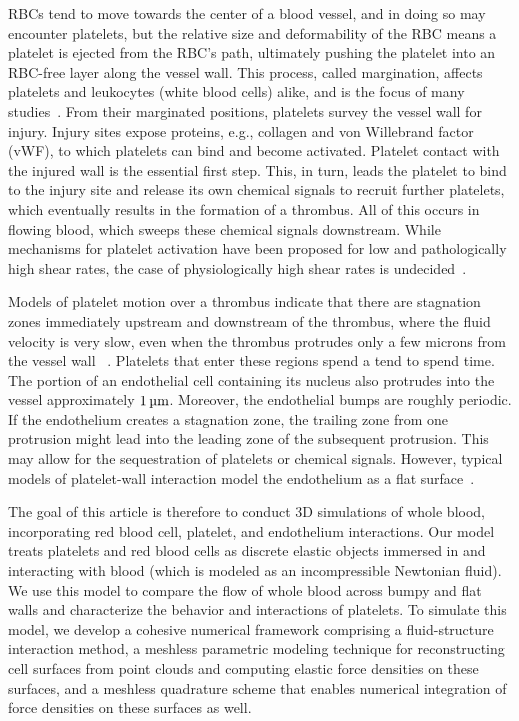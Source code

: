 RBCs tend to move towards the center of a blood vessel, and in doing so may encounter
platelets, but the relative size and deformability of the RBC means a platelet is ejected
from the RBC's path, ultimately pushing the platelet into an RBC-free layer along the
vessel wall. This process, called margination, affects platelets and leukocytes (white
blood cells) alike, and is the focus of many studies~\cite{Freund:2007kx,Erickson:2010ep,
Erickson:2011cf,Zhao:2011do,Kumar:2011dd,Zhao:2012ggba,Fedosov:2012dy,Kumar:2012ie,
Fedosov:2013ul,Muller:2014is,Fedosov:2014bs, Vahidkhah:2014hy,Vahidkhah:2015ch,
Mehrabadi:2016fn}. From their marginated positions, platelets survey the vessel wall for
injury. Injury sites expose proteins, e.g., collagen and von Willebrand factor (vWF), to
which platelets can bind and become activated. Platelet contact with the injured wall is
the essential first step. This, in turn, leads the platelet to bind to the injury site
and release its own chemical signals to recruit further platelets, which eventually
results in the formation of a thrombus. All of this occurs in flowing blood, which sweeps
these chemical signals downstream. While mechanisms for platelet activation have been
proposed for low and pathologically high shear rates, the case of physiologically high
shear rates is undecided~\cite{Fogelson:2015fb}.

Models of platelet motion over a thrombus indicate that there are stagnation zones
immediately upstream and downstream of the thrombus, where the fluid velocity is very
slow, even when the thrombus protrudes only a few microns from the vessel wall~%
\cite{Skorczewski:2013jn,Wang:2013gs}. Platelets that enter these regions spend a
tend to spend time. The portion of an endothelial cell containing its nucleus also
protrudes into the vessel approximately $1\um$. Moreover, the endothelial bumps are
roughly periodic. If the endothelium creates a stagnation zone, the trailing zone from
one protrusion might lead into the leading zone of the subsequent protrusion. This may
allow for the sequestration of platelets or chemical signals. However, typical models of
platelet-wall interaction model the endothelium as a flat
surface~\cite{Wu:2014gt,Vahidkhah:2015ch}.

The goal of this article is therefore to conduct 3D simulations of whole blood,
incorporating red blood cell, platelet, and endothelium interactions. Our model treats
platelets and red blood cells as discrete elastic objects immersed in and interacting
with blood (which is modeled as an incompressible Newtonian fluid). We use this model to
compare the flow of whole blood across bumpy and flat walls and characterize the behavior
and interactions of platelets. To simulate this model, we develop a cohesive numerical
framework comprising a fluid-structure interaction method, a meshless parametric modeling
technique for reconstructing cell surfaces from point clouds and computing elastic force
densities on these surfaces, and a meshless quadrature scheme that enables numerical
integration of force densities on these surfaces as well.

